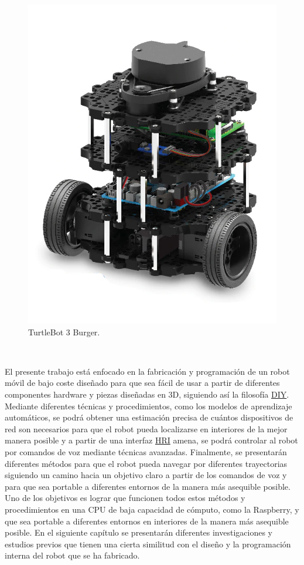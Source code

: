 \begin{figure} [H]
  \begin{center}
    \includegraphics[scale=0.25]{figs/turtlebot3burguer.jpg}
  \end{center}
  \caption{TurtleBot 3 Burger.}
  \label{fig:turtlebot}
\end{figure}\


El presente trabajo está enfocado en la fabricación y programación de un robot móvil de bajo coste diseñado para que sea fácil de usar a partir de diferentes componentes hardware y piezas diseñadas en 3D, siguiendo así la filosofía \hyperlink{DIY}{DIY}. Mediante diferentes técnicas y procedimientos, como los modelos de aprendizaje automáticos, se podrá obtener una estimación precisa de cuántos dispositivos de red son necesarios para que el robot pueda localizarse en interiores de la mejor manera posible y a partir de una interfaz \hyperlink{HRI}{HRI} amena, se podrá controlar al robot por comandos de voz mediante técnicas avanzadas. Finalmente, se presentarán diferentes métodos para que el robot pueda navegar por diferentes trayectorias siguiendo un camino hacia un objetivo claro a partir de los comandos de voz y para que sea portable a diferentes entornos de la manera más asequible posible. Uno de los objetivos es lograr que funcionen todos estos métodos y procedimientos en una CPU de baja capacidad de cómputo, como la Raspberry, y que sea portable a diferentes entornos en interiores de la manera más asequible posible. En el siguiente capítulo se presentarán diferentes investigaciones y estudios previos que tienen una cierta similitud con el diseño y la programación interna del robot que se ha fabricado.

\vspace{15cm} %








